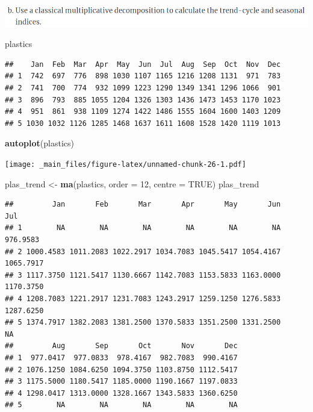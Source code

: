 \documentclass[]{book}
\newenvironment{Shaded}{\begin{snugshade}}{\end{snugshade}}
\newcommand{\DataTypeTok}[1]{\textcolor[rgb]{0.13,0.29,0.53}{#1}}
\newcommand{\DecValTok}[1]{\textcolor[rgb]{0.00,0.00,0.81}{#1}}
\newcommand{\KeywordTok}[1]{\textcolor[rgb]{0.13,0.29,0.53}{\textbf{#1}}}
\newcommand{\NormalTok}[1]{#1}
\newcommand{\OtherTok}[1]{\textcolor[rgb]{0.56,0.35,0.01}{#1}}
\newcommand{\StringTok}[1]{\textcolor[rgb]{0.31,0.60,0.02}{#1}}
\begin{document}
\includegraphics{./week2/6.2b.png}

\begin{Shaded}
\begin{Highlighting}[]
\NormalTok{plastics}
\end{Highlighting}
\end{Shaded}

\begin{verbatim}
##    Jan  Feb  Mar  Apr  May  Jun  Jul  Aug  Sep  Oct  Nov  Dec
## 1  742  697  776  898 1030 1107 1165 1216 1208 1131  971  783
## 2  741  700  774  932 1099 1223 1290 1349 1341 1296 1066  901
## 3  896  793  885 1055 1204 1326 1303 1436 1473 1453 1170 1023
## 4  951  861  938 1109 1274 1422 1486 1555 1604 1600 1403 1209
## 5 1030 1032 1126 1285 1468 1637 1611 1608 1528 1420 1119 1013
\end{verbatim}

\begin{Shaded}
\begin{Highlighting}[]
\KeywordTok{autoplot}\NormalTok{(plastics)}
\end{Highlighting}
\end{Shaded}

\texttt{[image: \_main\_files/figure-latex/unnamed-chunk-26-1.pdf]}

\begin{Shaded}
\begin{Highlighting}[]
\NormalTok{plas_trend <-}\StringTok{ }\KeywordTok{ma}\NormalTok{(plastics, }\DataTypeTok{order =} \DecValTok{12}\NormalTok{, }\DataTypeTok{centre =} \OtherTok{TRUE}\NormalTok{)}
\NormalTok{plas_trend}
\end{Highlighting}
\end{Shaded}

\begin{verbatim}
##         Jan       Feb       Mar       Apr       May       Jun       Jul
## 1        NA        NA        NA        NA        NA        NA  976.9583
## 2 1000.4583 1011.2083 1022.2917 1034.7083 1045.5417 1054.4167 1065.7917
## 3 1117.3750 1121.5417 1130.6667 1142.7083 1153.5833 1163.0000 1170.3750
## 4 1208.7083 1221.2917 1231.7083 1243.2917 1259.1250 1276.5833 1287.6250
## 5 1374.7917 1382.2083 1381.2500 1370.5833 1351.2500 1331.2500        NA
##         Aug       Sep       Oct       Nov       Dec
## 1  977.0417  977.0833  978.4167  982.7083  990.4167
## 2 1076.1250 1084.6250 1094.3750 1103.8750 1112.5417
## 3 1175.5000 1180.5417 1185.0000 1190.1667 1197.0833
## 4 1298.0417 1313.0000 1328.1667 1343.5833 1360.6250
## 5        NA        NA        NA        NA        NA
\end{verbatim}
\end{document}
